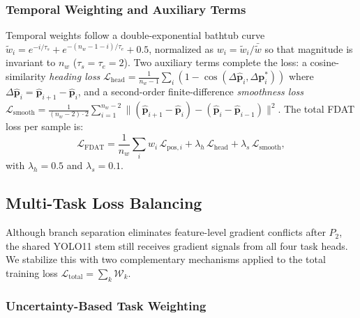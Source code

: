 \subsubsection{Temporal Weighting and Auxiliary Terms}

Temporal weights follow a double-exponential bathtub curve
$\tilde{w}_i = e^{-i/\tau_s} + e^{-(n_w-1-i)/\tau_e} + 0.5$,
normalized as $w_i = \tilde{w}_i / \bar{\tilde{w}}$ so that
magnitude is invariant to $n_w$ ($\tau_s{=}\tau_e{=}2$).
Two auxiliary terms complete the loss: a cosine-similarity
\emph{heading loss}
$\mathcal{L}_{\mathrm{head}} = \frac{1}{n_w-1}\sum_i(1 - \cos(\Delta\hat{\mathbf{p}}_i, \Delta\mathbf{p}^*_i))$
where $\Delta\hat{\mathbf{p}}_i{=}\hat{\mathbf{p}}_{i+1}{-}\hat{\mathbf{p}}_i$,
and a second-order finite-difference \emph{smoothness loss}
$\mathcal{L}_{\mathrm{smooth}} = \frac{1}{(n_w{-}2){\cdot}2}\sum_{i=1}^{n_w-2}\|(\hat{\mathbf{p}}_{i+1}{-}\hat{\mathbf{p}}_i){-}(\hat{\mathbf{p}}_i{-}\hat{\mathbf{p}}_{i-1})\|^2$.
The total FDAT loss per sample is:
\begin{equation}
  \mathcal{L}_{\mathrm{FDAT}}
    = \frac{1}{n_w}\!\sum_{i} w_i\,\mathcal{L}_{\mathrm{pos},i}
      + \lambda_h\,\mathcal{L}_{\mathrm{head}}
      + \lambda_s\,\mathcal{L}_{\mathrm{smooth}},
  \label{eq:fdat}
\end{equation}
with $\lambda_h{=}0.5$ and $\lambda_s{=}0.1$.

\subsection{Multi-Task Loss Balancing}

Although branch separation eliminates feature-level gradient
conflicts after $P_2$, the shared YOLO11 stem still receives
gradient signals from all four task heads.
We stabilize this with two complementary mechanisms applied to the
total training loss
$\mathcal{L}_{\mathrm{total}} = \sum_k \mathcal{W}_k$.

\subsubsection{Uncertainty-Based Task Weighting}

